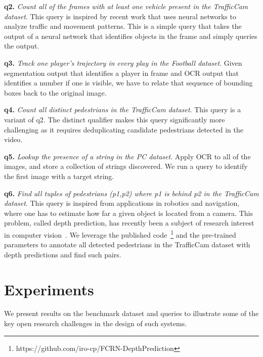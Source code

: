 \vspace{0.25em} \noindent \textbf{q2.} \emph{Count all of the frames with at least one vehicle present in the TrafficCam dataset}. This query is inspired by recent work that uses neural networks to analyze traffic and movement patterns. This is a simple query that takes the output of a neural network that identifies objects in the frame and simply queries the output.

\vspace{0.25em} \noindent \textbf{q3.} \emph{Track one player's trajectory in every play in the Football dataset}. Given segmentation output that identifies a player in frame and OCR output that identifies a number if one is visible, we have to relate that sequence of bounding boxes back to the original image.

\vspace{0.25em} \noindent \textbf{q4.} \emph{Count all distinct pedestrians in the TrafficCam dataset}. This query is a variant of q2. The distinct qualifier makes this query significantly more challenging as it requires deduplicating candidate pedestrians detected in the video.

\vspace{0.25em} \noindent \textbf{q5.} \emph{Lookup the presence of a string in the PC dataset}. Apply OCR to all of the images, and store a collection of strings discovered. We run a query to identify the first image with a target string.

\vspace{0.25em} \noindent \textbf{q6.} \emph{Find all tuples of pedestrians (p1,p2) where p1 is behind p2 in the TrafficCam dataset}. This query is inspired from applications in robotics and navigation, where one has to estimate how far a given object is located from a camera. This problem, called depth prediction, has recently been a subject of research interest in computer vision~\cite{depthPredictModel}. We leverage the published code~\footnote{https://github.com/iro-cp/FCRN-DepthPrediction} and the pre-trained parameters to annotate all detected pedestrians in the TrafficCam dataset with depth predictions and find such pairs.

\section{Experiments}
We present results on the benchmark dataset and queries to illustrate some of the key open research challenges in the design of such systems.


